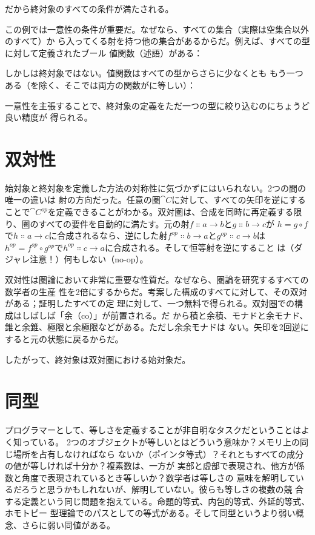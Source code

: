 だから終対象のすべての条件が満たされる。

この例では一意性の条件が重要だ。なぜなら、すべての集合（実際は空集合以外のすべて）か
ら入ってくる射を持つ他の集合があるからだ。例えば、すべての型に対して定義されたブール
値関数（述語）がある：

しかしは終対象ではない。値関数はすべての型からさらに少なくとも
もう一つある（を除く、そこでは両方の関数がに等しい）：

一意性を主張することで、終対象の定義をただ一つの型に絞り込むのにちょうど良い精度が
得られる。

\section{双対性}

始対象と終対象を定義した方法の対称性に気づかずにはいられない。2つの間の唯一の違いは
射の方向だった。任意の圏$\cat{C}$に対して、すべての矢印を逆にすることで$\cat{C}^\mathit{op}$を定義できることがわかる。双対圏は、合成を同時に再定義する限
り、圏のすべての要件を自動的に満たす。元の射$f \Colon a \to b$と$g \Colon b \to c$が
$h = g \circ f$で$h \Colon a \to c$に合成されるなら、逆にした射$f^\mathit{op} \Colon
b \to a$と$g^\mathit{op} \Colon c \to b$は$h^\mathit{op} = f^\mathit{op} \circ
g^\mathit{op}$で$h^\mathit{op} \Colon c \to a$に合成される。そして恒等射を逆にすること
は（ダジャレ注意！）何もしない（no-op）。

双対性は圏論において非常に重要な性質だ。なぜなら、圏論を研究するすべての数学者の生産
性を2倍にするからだ。考案した構成のすべてに対して、その双対がある；証明したすべての定
理に対して、一つ無料で得られる。双対圏での構成はしばしば「余（co）」が前置される。だ
から積と余積、モナドと余モナド、錐と余錐、極限と余極限などがある。ただし余余モナドは
ない。矢印を2回逆にすると元の状態に戻るからだ。

したがって、終対象は双対圏における始対象だ。

\section{同型}

プログラマーとして、等しさを定義することが非自明なタスクだということはよく知っている。
2つのオブジェクトが等しいとはどういう意味か？メモリ上の同じ場所を占有しなければなら
ないか（ポインタ等式）？それともすべての成分の値が等しければ十分か？複素数は、一方が
実部と虚部で表現され、他方が係数と角度で表現されているとき等しいか？数学者は等しさの
意味を解明しているだろうと思うかもしれないが、解明していない。彼らも等しさの複数の競
合する定義という同じ問題を抱えている。命題的等式、内包的等式、外延的等式、ホモトピー
型理論でのパスとしての等式がある。そして同型というより弱い概念、さらに弱い同値がある。

